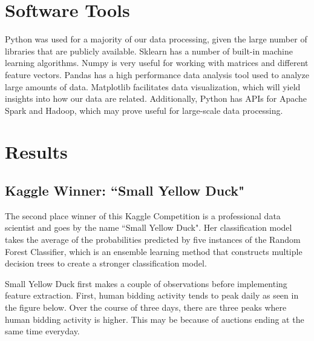 \documentclass{article} %
\begin{document}
\section{Software Tools}

Python was used for a majority of our data processing, given the large number of libraries that are publicly available.
Sklearn has a number of built-in machine learning algorithms.
Numpy is very useful for working with matrices and different feature vectors.
Pandas has a high performance data analysis tool used to analyze large amounts of data.
Matplotlib facilitates data visualization, which will yield insights into how our data are related.
Additionally, Python has APIs for Apache Spark and Hadoop, which may prove useful for large-scale data processing.

\section{Results}

\subsection{Kaggle Winner: ``Small Yellow Duck"}

The second place winner of this Kaggle Competition is a professional data scientist and goes by the name ``Small Yellow Duck".
Her classification model takes the average of the probabilities predicted by five instances of the Random Forest Classifier, which is an ensemble learning method that constructs multiple decision trees to create a stronger classification model.

Small Yellow Duck first makes a couple of observations before implementing feature extraction.
First, human bidding activity tends to peak daily as seen in the figure below.
Over the course of three days, there are three peaks where human bidding activity is higher.
This may be because of auctions ending at the same time everyday.

\begin{figure}[h]
\centering
{}
\end{figure}
\end{document}

